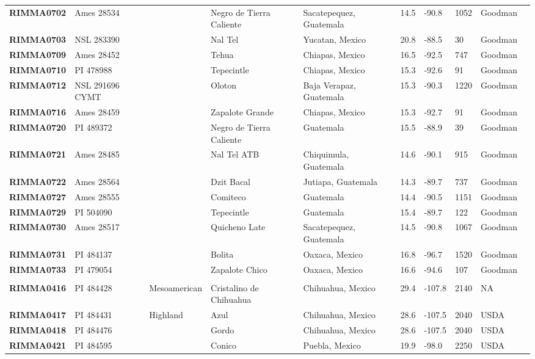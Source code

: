 \begin{table}[h]
\begin{center}
{\begin{tabular}{llllllllll}
{\bf RIMMA0702}	&	Ames 28534	&		&	Negro de Tierra Caliente	&	Sacatepequez, Guatemala	&	14.5 	&	-90.8 	&	1052	&	Goodman	\\
{\bf RIMMA0703}	&	NSL 283390	&		&	Nal Tel	&	Yucatan, Mexico	&	20.8 	&	-88.5 	&	30	&	Goodman	\\
{\bf RIMMA0709}	&	Ames 28452	&		&	Tehua	&	Chiapas, Mexico	&	16.5 	&	-92.5 	&	747	&	Goodman	\\
{\bf RIMMA0710}	&	PI 478988	&		&	Tepecintle	&	Chiapas, Mexico	&	15.3 	&	-92.6 	&	91	&	Goodman	\\
{\bf RIMMA0712}	&	NSL 291696 CYMT	&		&	Oloton	&	Baja Verapaz, Guatemala	&	15.3 	&	-90.3 	&	1220	&	Goodman	\\
{\bf RIMMA0716}	&	Ames 28459	&		&	Zapalote Grande	&	Chiapas, Mexico	&	15.3 	&	-92.7 	&	91	&	Goodman	\\
{\bf RIMMA0720}	&	PI 489372	&		&	Negro de Tierra Caliente	&	Guatemala	&	15.5 	&	-88.9 	&	39	&	Goodman	\\
{\bf RIMMA0721}	&	Ames 28485	&		&	Nal Tel ATB	&	Chiquimula, Guatemala	&	14.6 	&	-90.1 	&	915	&	Goodman	\\
{\bf RIMMA0722}	&	Ames 28564	&		&	Dzit Bacal	&	Jutiapa, Guatemala	&	14.3 	&	-89.7 	&	737	&	Goodman	\\
{\bf RIMMA0727}	&	Ames 28555	&		&	Comiteco	&	Guatemala	&	14.4 	&	-90.5 	&	1151	&	Goodman	\\
{\bf RIMMA0729}	&	PI 504090	&		&	Tepecintle	&	Guatemala	&	15.4 	&	-89.7 	&	122	&	Goodman	\\
{\bf RIMMA0730}	&	Ames 28517	&		&	Quicheno Late	&	Sacatepequez, Guatemala	&	14.5 	&	-90.8 	&	1067	&	Goodman	\\
{\bf RIMMA0731}	&	PI 484137	&		&	Bolita	&	Oaxaca, Mexico	&	16.8 	&	-96.7 	&	1520	&	Goodman	\\
{\bf RIMMA0733}	&	PI 479054	&		&	Zapalote Chico	&	Oaxaca, Mexico	&	16.6 	&	-94.6 	&	107	&	Goodman	\\
	\hline 
	& & & \\[-4mm] 
{\bf RIMMA0416}	&	PI 484428	&	Mesoamerican	&	Cristalino de Chihuahua	&	Chihuahua, Mexico	&	29.4 	&	-107.8 	&	2140	&	NA	\\
{\bf RIMMA0417}	&	PI 484431	&	Highland	&	Azul	&	Chihuahua, Mexico	&	28.6 	&	-107.5 	&	2040	&	USDA	\\
{\bf RIMMA0418}	&	PI 484476	&		&	Gordo	&	Chihuahua, Mexico	&	28.6 	&	-107.5 	&	2040	&	USDA	\\
{\bf RIMMA0421}	&	PI 484595	&		&	Conico	&	Puebla, Mexico	&	19.9 	&	-98.0 	&	2250	&	USDA	\\

\end{tabular}}
\end{center}
\end{table}
